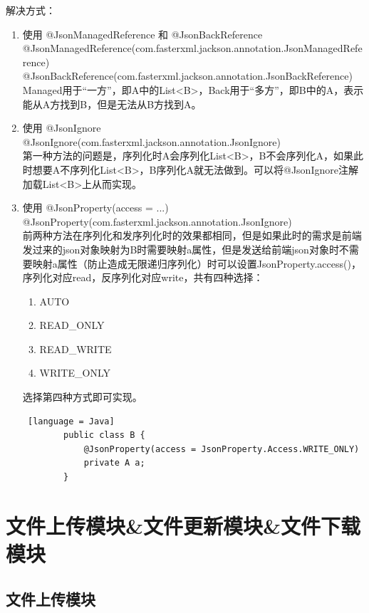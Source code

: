 解决方式：
\begin{enumerate}
  \item 使用 @JsonManagedReference 和 @JsonBackReference\\
        @JsonManagedReference(com.fasterxml.jackson.annotation.JsonManagedReference)\\
        @JsonBackReference(com.fasterxml.jackson.annotation.JsonBackReference)\\
        Managed用于“一方”，即A中的List<B>，Back用于“多方”，即B中的A，表示能从A方找到B，但是无法从B方找到A。
  \item 使用 @JsonIgnore\\
        @JsonIgnore(com.fasterxml.jackson.annotation.JsonIgnore)\\
        第一种方法的问题是，序列化时A会序列化List<B>，B不会序列化A，如果此时想要A不序列化List<B>，B序列化A就无法做到。可以将@JsonIgnore注解加载List<B>上从而实现。
  \item 使用 @JsonProperty(access = ...)\\
        @JsonProperty(com.fasterxml.jackson.annotation.JsonIgnore)\\
        前两种方法在序列化和发序列化时的效果都相同，但是如果此时的需求是前端发过来的json对象映射为B时需要映射a属性，但是发送给前端json对象时不需要映射a属性（防止造成无限递归序列化）时可以设置JsonProperty.access()，序列化对应read，反序列化对应write，共有四种选择：
        \begin{enumerate}
          \item AUTO
          \item READ\_ONLY
          \item READ\_WRITE
          \item WRITE\_ONLY
        \end{enumerate}
        选择第四种方式即可实现。
        \begin{lstlisting} [language = Java]
        public class B {
            @JsonProperty(access = JsonProperty.Access.WRITE_ONLY)
            private A a;
        }
    \end{lstlisting}
\end{enumerate}

\section{文件上传模块\&文件更新模块\&文件下载模块}

\subsection{文件上传模块}

